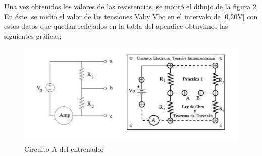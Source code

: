 \documentclass[a4paper,11pt]{article}
\begin{document}
Una vez obtenidos los valores de las resistencias, se montó el dibujo de la figura 2. En éste, se midió el valor de las tensiones Vaby Vbc en el intervalo de [0,20V] con estos datos que quedan reflejados en la tabla del apendice obtuvimos las siguientes gráficas:


\begin{figure}[hbtp]
\centering
\includegraphics[scale=0.5]{Imagenes/Entrenador.png}
\caption{Circuito A del entrenador}
\end{figure}
\end{document}
